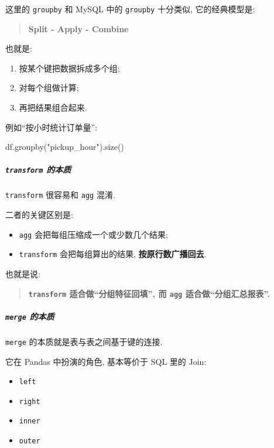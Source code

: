 \documentclass[11pt]{article}
\providecommand{\tightlist}{%
      \setlength{\itemsep}{0pt}\setlength{\parskip}{0pt}}
\newenvironment{Shaded}{}{}
\newcommand{\StringTok}[1]{\textcolor[rgb]{0.25,0.44,0.63}{{#1}}}
\newcommand{\NormalTok}[1]{{#1}}
\begin{document}
    这里的 \texttt{groupby} 和 MySQL 中的 \texttt{groupby} 十分类似,
它的经典模型是:

\begin{quote}
\textbf{Split - Apply - Combine}
\end{quote}

也就是:

\begin{enumerate}
\def\labelenumi{\arabic{enumi}.}
\tightlist
\item
  按某个键把数据拆成多个组;
\item
  对每个组做计算;
\item
  再把结果组合起来.
\end{enumerate}

例如``按小时统计订单量'':

\begin{Shaded}
\begin{Highlighting}[]
\NormalTok{df.groupby(}\StringTok{"pickup\_hour"}\NormalTok{).size()}
\end{Highlighting}
\end{Shaded}

    \subparagraph{\texorpdfstring{\texttt{transform}
的本质}{transform 的本质}}\label{transform-ux7684ux672cux8d28}

    \texttt{transform} 很容易和 \texttt{agg} 混淆.

二者的关键区别是:

\begin{itemize}
\tightlist
\item
  \texttt{agg} 会把每组压缩成一个或少数几个结果;
\item
  \texttt{transform} 会把每组算出的结果, \textbf{按原行数广播回去}.
\end{itemize}

也就是说:

\begin{quote}
\textbf{\texttt{transform} 适合做``分组特征回填'', 而 \texttt{agg}
适合做``分组汇总报表''.}
\end{quote}

    \subparagraph{\texorpdfstring{\texttt{merge}
的本质}{merge 的本质}}\label{merge-ux7684ux672cux8d28}

    \texttt{merge} 的本质就是表与表之间基于键的连接.

它在 Pandas 中扮演的角色, 基本等价于 SQL 里的 Join:

\begin{itemize}
\tightlist
\item
  \texttt{left}
\item
  \texttt{right}
\item
  \texttt{inner}
\item
  \texttt{outer}
\end{itemize}
\end{document}
